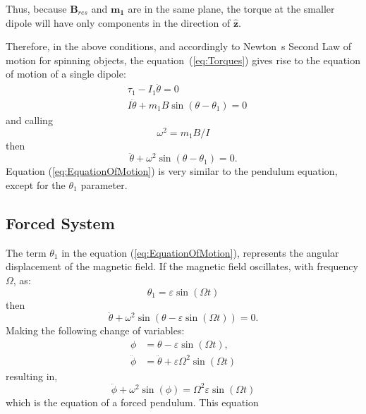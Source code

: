 Thus, because $\boldsymbol{B}_{res}$ and $\boldsymbol{m_1}$ are in the same plane, the torque at the smaller dipole will have only components in the direction of $\boldsymbol{\hat{z}}$.

Therefore, in the above conditions, and accordingly to Newton~\textquotesingle s Second Law of motion for spinning objects, the equation~(\ref{eq:Torques}) gives rise to the equation of motion of a single dipole:
\begin{equation}
    \begin{aligned}
        &\tau_1 - I_1 \ddot{\theta} = 0\\
        &I \ddot{\theta} + m_1 B \sin(\theta - \theta_1) = 0        
    \end{aligned}
\end{equation}
and calling
\begin{equation}
    \omega^2 = m_1 B/I 
\end{equation} 
then
\begin{equation}
    \ddot{\theta} +\omega^2 \sin(\theta - \theta_1) = 0.
    \label{eq:EquationOfMotion}
\end{equation}
Equation (\ref{eq:EquationOfMotion}) is very similar to the pendulum equation, except for the $\theta_1$ parameter.
\subsection{Forced System}
The term $\theta_1$ in the equation (\ref{eq:EquationOfMotion}), represents the angular displacement of the magnetic field. If the magnetic field oscillates, with frequency $\Omega$, as:
\begin{equation}
    \theta_1 = \varepsilon \sin(\Omega t)
\end{equation}
then
\begin{equation}
    \ddot{\theta} +\omega^2 \sin(\theta - \varepsilon \sin(\Omega t)) = 0.
\end{equation}
Making the following change of variables:
\begin{equation}
    \begin{aligned}
        \phi &= \theta - \varepsilon \sin(\Omega t),\\
        \ddot{\phi} &= \ddot{\theta} + \varepsilon \Omega^2 \sin(\Omega t)
    \end{aligned}
\end{equation}
resulting in, 
\begin{equation}
    \ddot{\phi} + \omega^2 \sin(\phi) =\Omega^2 \varepsilon \sin(\Omega t)
\end{equation}
which is the equation of a forced pendulum. This equation
